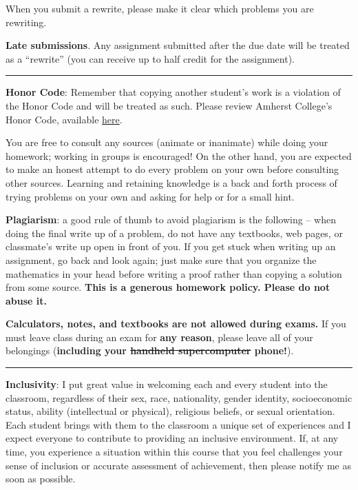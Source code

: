 \documentclass[12pt]{article}
\begin{document}
\noindent When you submit a rewrite, please make it clear which problems you are rewriting.

\bigskip
\noindent\textbf{Late submissions}. Any assignment submitted after the due date will be treated as a ``rewrite'' (you can receive up to half credit for the assignment).

\smallskip \hrule \medskip

\noindent\textbf{Honor Code}: Remember that copying another student's work is a violation of the Honor Code and will be treated as such. Please review Amherst College's Honor Code, available \href{https://www.amherst.edu/offices/student-affairs/community-standards/college-standards/honor-code}{here}.

You are free to consult any sources (animate or inanimate) while doing your homework; working in groups is encouraged! %
On the other hand, you are expected to make an honest attempt to do every problem on your own before consulting other sources. Learning and retaining knowledge is a back and forth process of trying problems on your own and asking for help or for a small hint.

\bigskip
\noindent\textbf{Plagiarism}: a good rule of thumb to avoid plagiarism is the following -- when doing the final write up of a problem, do not have any textbooks, web pages, or classmate's write up open in front of you. If you get stuck when writing up an assignment, go back and look again; just make sure that you organize the mathematics in your head before writing a proof rather than copying a solution from some source. \textbf{This is a generous homework policy. Please do not abuse it.}

\bigskip
\noindent \textbf{Calculators, notes, and textbooks are not allowed during exams.}
 If you must leave class during an exam for \textbf{any reason}, please leave all of your belongings (\textbf{including your \sout{handheld supercomputer} phone!}).

\smallskip \hrule \medskip

\noindent\textbf{Inclusivity}: I put great value in welcoming each and every student into the classroom, regardless of their
sex, race, nationality, gender identity, socioeconomic status, ability (intellectual or physical), religious beliefs, or sexual orientation. Each student brings with them to the classroom a unique set of experiences and I expect everyone to contribute to providing an inclusive environment. If, at any time, you experience a situation within this course that you feel challenges your sense of inclusion or accurate assessment of achievement, then please notify me as soon as possible.
\end{document}
